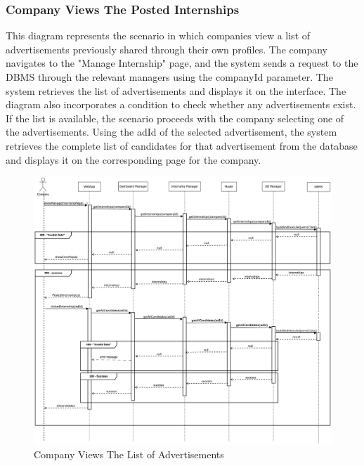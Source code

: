 \documentclass[a4paper,12pt]{article}
\begin{document}
\subsubsection*{ Company Views The Posted Internships} 
This diagram represents the scenario in which companies view a list of advertisements previously shared through their own profiles. The company navigates to the "Manage Internship" page, and the system sends a request to the DBMS through the relevant managers using the companyId parameter. The system retrieves the list of advertisements and displays it on the interface. The diagram also incorporates a condition to check whether any advertisements exist. If the list is available, the scenario proceeds with the company selecting one of the advertisements. Using the adId of the selected advertisement, the system retrieves the complete list of candidates for that advertisement from the database and displays it on the corresponding page for the company.
\begin{figure}[H]
    \centering
    \includegraphics[scale = 0.25]{DD_figures/RuntimeView/companyViewStudent.drawio.png}
    \caption{Company Views The List of Advertisements}
    \centering
\end{figure}
\newpage
\end{document}
